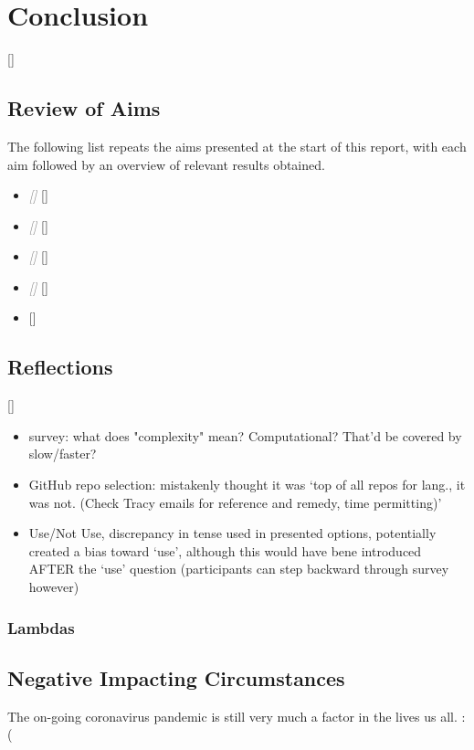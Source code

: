 \documentclass{article}
\begin{document}
\section{Conclusion}
\label{sec:conclusion}
    []
    \subsection{Review of Aims}
        The following list repeats the aims presented at the start of this report, with each aim followed by an overview of relevant results obtained.
        \begin{itemize}
            \item \textcolor{gray}{\textit{[]}}
                []
            \item \textcolor{gray}{\textit{[]}}
                []
            \item \textcolor{gray}{\textit{[]}}
                []
            \item \textcolor{gray}{\textit{[]}}
                []
            \item \textcolor{gray}{\textit{}}
                []
        \end{itemize}
    \subsection{Reflections}
        []
        \begin{itemize}
            \item survey: what does "complexity" mean? Computational? That'd be covered by slow/faster?
            \item GitHub repo selection: mistakenly thought it was `top of all repos for lang., it was not. (Check Tracy emails for reference and remedy, time permitting)'
            \item Use/Not Use, discrepancy in tense used in presented options, potentially created a bias toward `use', although this would have bene introduced AFTER the `use' question (participants can step backward through survey however)
        \end{itemize}

        \subsubsection{Lambdas}
        \label{subsubsec:lambdas}

        
    \subsection{Negative Impacting Circumstances}
        The on-going coronavirus pandemic is still very much a factor in the lives us all. :(
\end{document}
